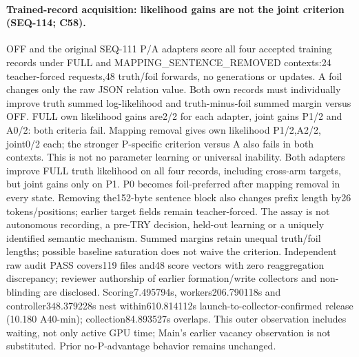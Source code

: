 \documentclass{article}
\begin{document}
\paragraph{Trained-record acquisition: likelihood gains are not the joint criterion (SEQ-114; C58).} OFF and the original SEQ-111 P/A adapters score all four accepted training records under FULL and MAPPING\_SENTENCE\_REMOVED contexts:24 teacher-forced requests,48 truth/foil forwards, no generations or updates. A foil changes only the raw JSON relation value. Both own records must individually improve truth summed log-likelihood and truth-minus-foil summed margin versus OFF. FULL own likelihood gains are2/2 for each adapter, joint gains P1/2 and A0/2: both criteria fail. Mapping removal gives own likelihood P1/2,A2/2, joint0/2 each; the stronger P-specific criterion versus A also fails in both contexts. This is not no parameter learning or universal inability. Both adapters improve FULL truth likelihood on all four records, including cross-arm targets, but joint gains only on P1. P0 becomes foil-preferred after mapping removal in every state. Removing the152-byte sentence block also changes prefix length by26 tokens/positions; earlier target fields remain teacher-forced. The assay is not autonomous recording, a pre-TRY decision, held-out learning or a uniquely identified semantic mechanism. Summed margins retain unequal truth/foil lengths; possible baseline saturation does not waive the criterion. Independent raw audit PASS covers119 files and48 score vectors with zero reaggregation discrepancy; reviewer authorship of earlier formation/write collectors and non-blinding are disclosed. Scoring7.495794s, workers206.790118s and controller348.379228s nest within610.814112s launch-to-collector-confirmed release (10.180 A40-min); collection84.893527s overlaps. This outer observation includes waiting, not only active GPU time; Main's earlier vacancy observation is not substituted. Prior no-P-advantage behavior remains unchanged.
\end{document}
